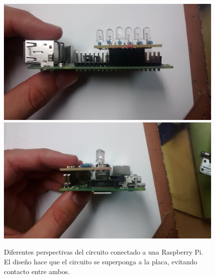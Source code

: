 \documentclass{article}
\begin{document}
\begin{figure}[H]
\centering
\includegraphics[height=0.2\textheight]{led/vista1}
\includegraphics[height=0.2\textheight]{led/vista2}
\caption{Diferentes perspectivas del circuito conectado a una Raspberry Pi. El diseño hace que el circuito se superponga a la placa, evitando contacto entre ambos.}
\end{figure}
\end{document}

